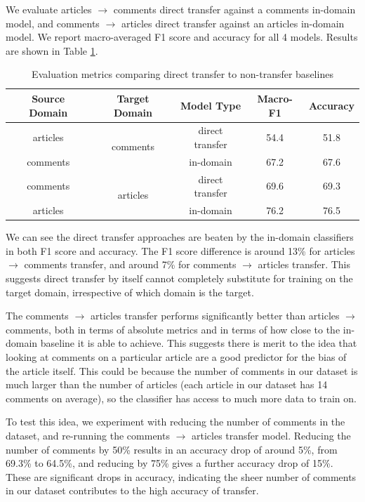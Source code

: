 We evaluate articles $ \rightarrow $ comments direct transfer against a comments in-domain model, and comments $ \rightarrow $ articles direct transfer against an articles in-domain model. We report macro-averaged F1 score and accuracy for all 4 models. Results are shown in Table \ref{tab:direct-transfer-results}.

\begin{table}[ht]
    \centering
    \begin{tabular}{|c|c|c|c|c|}
        \hline
        \textbf{Source Domain} & \textbf{Target Domain} & \textbf{Model Type} & \textbf{Macro-F1} & \textbf{Accuracy} \\
        \hline
        articles & \multirow{2}{4em}{comments} & direct transfer & 54.4 & 51.8 \\
        comments & & in-domain & 67.2 & 67.6 \\
        \hline
        comments & \multirow{2}{3em}{articles} & direct transfer & 69.6 & 69.3 \\
        articles & & in-domain & 76.2 & 76.5 \\
        \hline
    \end{tabular}
    \caption{Evaluation metrics comparing direct transfer to non-transfer baselines}
    \label{tab:direct-transfer-results}
\end{table}

We can see the direct transfer approaches are beaten by the in-domain classifiers in both F1 score and accuracy. The F1 score difference is around 13\% for articles $ \rightarrow $ comments transfer, and around 7\% for comments $ \rightarrow $ articles transfer. This suggests direct transfer by itself cannot completely substitute for training on the target domain, irrespective of which domain is the target.

The comments $ \rightarrow $ articles transfer performs significantly better than articles $ \rightarrow $ comments, both in terms of absolute metrics and in terms of how close to the in-domain baseline it is able to achieve. This suggests there is merit to the idea that looking at comments on a particular article are a good predictor for the bias of the article itself. This could be because the number of comments in our dataset is much larger than the number of articles (each article in our dataset has 14 comments on average), so the classifier has access to much more data to train on.

To test this idea, we experiment with reducing the number of comments in the dataset, and re-running the comments $ \rightarrow $ articles transfer model. Reducing the number of comments by 50\% results in an accuracy drop of around 5\%, from 69.3\% to 64.5\%, and reducing by 75\% gives a further accuracy drop of 15\%. These are significant drops in accuracy, indicating the sheer number of comments in our dataset contributes to the high accuracy of transfer.

